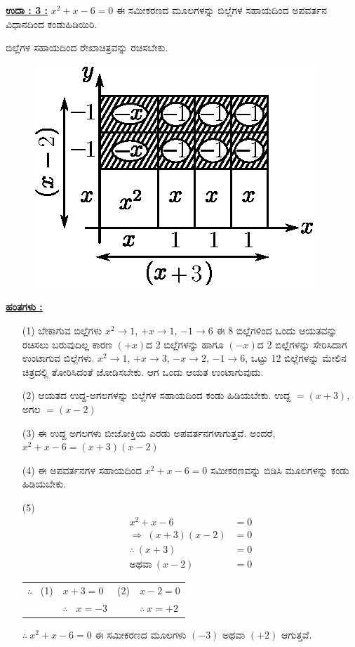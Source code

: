\noindent
{\textbf{\underline{ಉದಾ : 3 :}}} $x^2 + x - 6 = 0$ ಈ ಸಮೀಕರಣದ ಮೂಲಗಳನ್ನು ಬಿಲ್ಲೆಗಳ ಸಹಾಯದಿಂದ ಅಪವರ್ತನ ವಿಧಾನದಿಂದ ಕಂಡುಹಿಡಿಯಿರಿ. 

ಬಿಲ್ಲೆಗಳ ಸಹಾಯದಿಂದ ರೇಖಾಚಿತ್ರವನ್ನು ರಚಿಸಬೇಕು.
\begin{figure}[H]
\centering
\includegraphics[scale=0.8]{src/figure/chap3/fig3-53.eps}
\end{figure}

\noindent
{\textbf{\underline{ಹಂತಗಳು :}}}
\begin{itemize}
\item [(1)] ಬೇಕಾಗುವ ಬಿಲ್ಲೆಗಳು $x^2 \rightarrow 1$, $+x \rightarrow 1$, $-1 \rightarrow 6$ ಈ 8 ಬಿಲ್ಲೆ\break ಗಳಿಂದ ಒಂದು ಆಯತವನ್ನು ರಚಿಸಲು ಬರುವುದಿಲ್ಲ ಕಾರಣ $(+x)$ದ 2 ಬಿಲ್ಲೆಗಳನ್ನು ಹಾಗೂ $(-x)$ದ 2 ಬಿಲ್ಲೆಗಳನ್ನು ಸೇರಿಸಿದಾಗ ಉಂಟಾಗುವ ಬಿಲ್ಲೆಗಳು. $x^2 \rightarrow 1$, $+x \rightarrow 3$, $-x \rightarrow 2$, $-1 \rightarrow 6$, ಒಟ್ಟು 12 ಬಿಲ್ಲೆಗಳನ್ನು ಮೇಲಿನ ಚಿತ್ರದಲ್ಲಿ ತೋರಿಸಿದಂತೆ ಜೋಡಿಸಬೇಕು. ಆಗ ಒಂದು ಆಯತ ಉಂಟಾಗುವುದು. 
\item [(2)] ಆಯತದ ಉದ್ದ-ಅಗಲಗಳನ್ನು ಬಿಲ್ಲೆಗಳ ಸಹಾಯದಿಂದ ಕಂಡು ಹಿಡಿಯಬೇಕು. ಉದ್ದ $= (x+3)$, ಅಗಲ $= (x-2)$
\item [(3)] ಈ ಉದ್ದ ಅಗಲಗಳು ಬೀಜೋಕ್ತಿಯ ಎರಡು ಅಪವರ್ತನಗಳಾಗುತ್ತವೆ. ಅಂದರೆ, $x^2 + x - 6 = (x+3)(x-2)$
\item [(4)] ಈ ಅಪವರ್ತನಗಳ ಸಹಾಯದಿಂದ $x^2 + x - 6 = 0$ ಸಮೀಕರಣವನ್ನು ಬಿಡಿಸಿ ಮೂಲಗಳನ್ನು ಕಂಡು ಹಿಡಿಯಬೇಕು. 
\item [(5)] 
\begin{align*}
x^2 + x - 6 & = 0\\
\Rightarrow~ (x+3)(x-2) & = 0\\
\therefore~ (x+3) & = 0\tag{1}\\
\text{ಅಥವಾ}~ (x-2) & = 0\tag{2}
\end{align*}

\begin{tabular}{llll}
$\therefore$~ (1) & $x + 3 = 0$ & (2) & $x-2 = 0$\\
& $\therefore$~ $x = -3$ & &$\therefore~ x = +2$
\end{tabular}

\eject

$\therefore~ x^2 + x - 6 = 0$ ಈ ಸಮೀಕರಣದ ಮೂಲಗಳು $(-3)$ ಅಥವಾ $(+2)$ ಆಗುತ್ತವೆ.
\end{itemize}

